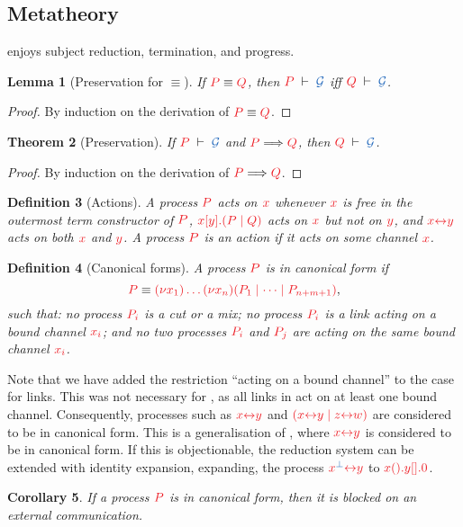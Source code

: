 \documentclass[submission,copyright,creativecommons]{eptcs}
\newtheorem{lemma}{Lemma}[section]
\newtheorem{theorem}[lemma]{Theorem}
\newtheorem{corollary}[lemma]{Corollary}
\newtheorem{definition}[lemma]{Definition}
\begin{document}
\subsection{Metatheory}
\hcp enjoys subject reduction, termination, and progress.
\begin{lemma}[Preservation for $\equiv$]\label{lem:hcp-preservation-equiv}
  If $\tm{P}\equiv\tm{Q}$, then $\seq[P]{\mathcal{G}}$ iff $\seq[Q]{\mathcal{G}}$.
\end{lemma} 
\begin{proof}
  By induction on the derivation of $\tm{P}\equiv\tm{Q}$.
\end{proof}
\begin{theorem}[Preservation]\label{thm:hcp-preservation}
  If $\seq[P]{\mathcal{G}}$ and $\reducesto{P}{Q}$, then $\seq[Q]{\mathcal{G}}$.
\end{theorem} 
\begin{proof}
  By induction on the derivation of $\reducesto{P}{Q}$.
\end{proof}
\begin{definition}[Actions]
  A process $\tm{P}$ acts on $\tm{x}$ whenever $\tm{x}$ is free in the outermost
  term constructor of $\tm{P}$, \eg $\tm{\cpSend{x}{y}{P}{Q}}$ acts on $\tm{x}$
  but not on $\tm{y}$, and $\tm{\cpLink{x}{y}}$ acts on both $\tm{x}$ and $\tm{y}$.
  A process $\tm{P}$ is an action if it acts on some channel $\tm{x}$.
\end{definition}
\begin{definition}[Canonical forms]
  A process $\tm{P}$ is in canonical form if
  \[
  \tm{P} \equiv \tm{\piNew{x_1}{\dots\piNew{x_n}{(P_1 \mid \dots \mid P_{n+m+1})}}},
  \]
  such that: no process $\tm{P_i}$ is a cut or a mix; no process $\tm{P_i}$ is a link acting on a bound channel $\tm{x_i}$; and no two processes $\tm{P_i}$ and $\tm{P_j}$ are acting on the same bound channel $\tm{x_i}$.
\end{definition}
Note that we have added the restriction ``acting on a bound channel'' to the case for links. This was not necessary for \cp, as all links in \cp act on at least one bound channel. Consequently, processes such as $\tm{\cpLink{x}{y}}$ and $\tm{(\piPar{\cpLink{x}{y}}{\cpLink{z}{w}})}$ are considered to be in canonical form. This is a generalisation of \cp, where $\tm{\cpLink{x}{y}}$ is considered to be in canonical form. If this is objectionable, the reduction system can be extended with identity expansion, expanding, \eg the process $\tm{\cpLink{x^{\ty{\bot}}}{y}}$ to $\tm{\cpWait{x}{\cpHalt{y}}}$.
\begin{corollary}
  If a process $\tm{P}$ is in canonical form, then it is blocked on an external communication.
\end{corollary}
\end{document}
